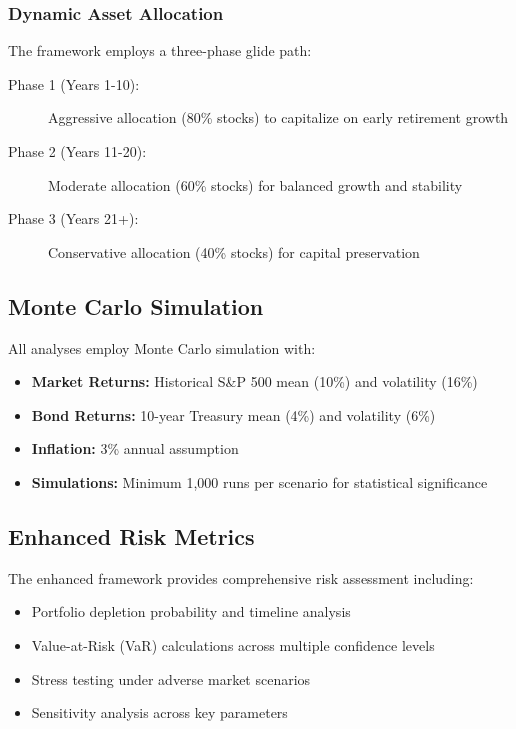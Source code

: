 \documentclass[11pt,a4paper]{article}
\begin{document}
\subsubsection{Dynamic Asset Allocation}
The framework employs a three-phase glide path:

\begin{description}
    \item[Phase 1 (Years 1-10):] Aggressive allocation (80\% stocks) to capitalize on early retirement growth
    \item[Phase 2 (Years 11-20):] Moderate allocation (60\% stocks) for balanced growth and stability  
    \item[Phase 3 (Years 21+):] Conservative allocation (40\% stocks) for capital preservation
\end{description}

\subsection{Monte Carlo Simulation}
All analyses employ Monte Carlo simulation with:
\begin{itemize}
    \item \textbf{Market Returns:} Historical S\&P 500 mean (10\%) and volatility (16\%)
    \item \textbf{Bond Returns:} 10-year Treasury mean (4\%) and volatility (6\%)
    \item \textbf{Inflation:} 3\% annual assumption
    \item \textbf{Simulations:} Minimum 1,000 runs per scenario for statistical significance
\end{itemize}

\subsection{Enhanced Risk Metrics}
The enhanced framework provides comprehensive risk assessment including:
\begin{itemize}
    \item Portfolio depletion probability and timeline analysis
    \item Value-at-Risk (VaR) calculations across multiple confidence levels
    \item Stress testing under adverse market scenarios
    \item Sensitivity analysis across key parameters
\end{itemize}

\end{document}
